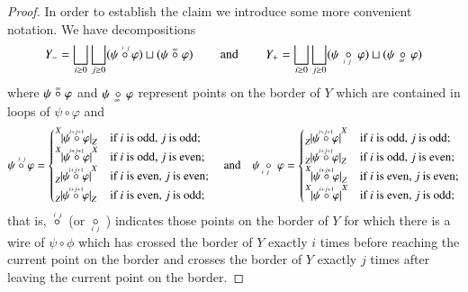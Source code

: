 \documentclass{amsart}
\def\tn{\textnormal}
\def\hsp{\hspace{.3in}}
\newcommand{\inp}[1]{{#1_-}}
\newcommand{\outp}[1]{{#1_+}}
\newcommand{\feeddd}[3]{{\tensor*[^{#2}_{\color{white}{!}}]{{|#1|}}{^{#3}}}}%
\newcommand{\feeddc}[3]{{\tensor*[^{#2}]{{|#1|}}{_{#3}}}}
\newcommand{\feedcd}[3]{{\tensor*[_{#2}]{{|#1|}}{^{#3}}}}
\newcommand{\feedcc}[3]{{\tensor*[^{\color{white}{!}}_{#2}]{{|#1|}}{_{#3}}}}
\theoremstyle{remark}
\theoremstyle{definition}
\begin{document}
\begin{proof}
In order to establish the claim we introduce some more convenient notation.  We have decompositions
\[\inp{Y}=\bigsqcup_{i\ge0}\bigsqcup_{j\ge0}(\psi\;\accentset{\,i\ j}{\circ}\;\varphi)\sqcup(\psi\;\accentset{\infty}{\circ}\;\varphi)\hsp\tn{and}\hsp \outp{Y}=\bigsqcup_{i\ge0}\bigsqcup_{j\ge0}(\psi\;\underaccent{\,\ i\ j}{\circ}\;\varphi)\sqcup(\psi\,\underaccent{\;\ \infty}{\circ}\,\varphi)\]
where $\psi\;\accentset{\infty}{\circ}\;\varphi$ and $\psi\,\underaccent{\ \;\infty}{\circ}\,\varphi$ represent points on the border of $Y$ which are contained in loops of $\psi\circ\varphi$ and
\[\psi\;\accentset{\,i\ j}{\circ}\;\varphi=\begin{cases}\feeddc{\psi\;\accentset{i+j+1}{\circ}\;\varphi}{X}{Z} & \text{if $i$ is odd, $j$ is odd;}\\\feeddd{\psi\;\accentset{i+j+1}{\circ}\;\varphi}{X}{X} & \text{if $i$ is odd, $j$ is even;}\\\feedcd{\psi\;\accentset{i+j+1}{\circ}\;\varphi}{Z}{X} & \text{if $i$ is even, $j$ is even;}\\\feedcc{\psi\;\accentset{i+j+1}{\circ}\;\varphi}{Z}{Z} & \text{if $i$ is even, $j$ is odd;}\end{cases}
\quad\tn{and}\quad
\psi\;\underaccent{i\ j}{\circ}\;\varphi=\begin{cases}\feedcd{\psi\;\accentset{i+j+1}{\circ}\;\varphi}{Z}{X} & \text{if $i$ is odd, $j$ is odd;}\\\feedcc{\psi\;\accentset{i+j+1}{\circ}\;\varphi}{Z}{Z} & \text{if $i$ is odd, $j$ is even;}\\\feeddc{\psi\;\accentset{i+j+1}{\circ}\;\varphi}{X}{Z} & \text{if $i$ is even, $j$ is even;}\\\feeddd{\psi\;\accentset{i+j+1}{\circ}\;\varphi}{X}{X} & \text{if $i$ is even, $j$ is odd;}\end{cases}\]
that is, $\ \accentset{\,i\ j}{\circ}\ $ (or $\ \underaccent{\,i\ j}{\circ}\,$ ) indicates those points on the border of $Y$ for which there is a wire of $\psi\circ\phi$ which has crossed the border of $Y$ exactly $i$ times before reaching the current point on the border and crosses the border of $Y$ exactly $j$ times after leaving the current point on the border.


\end{proof}
\end{document}
